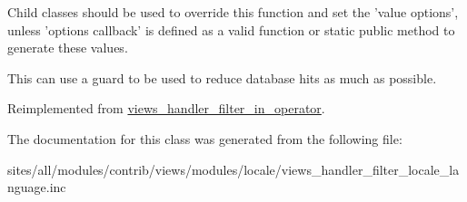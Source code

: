 Child classes should be used to override this function and set the 'value options', unless 'options callback' is defined as a valid function or static public method to generate these values.

This can use a guard to be used to reduce database hits as much as possible. 

Reimplemented from \hyperlink{classviews__handler__filter__in__operator_a5b5df6d90f4359ed28c0c446bdc81a6}{views\_\-handler\_\-filter\_\-in\_\-operator}.

The documentation for this class was generated from the following file:\begin{CompactItemize}
\item 
sites/all/modules/contrib/views/modules/locale/views\_\-handler\_\-filter\_\-locale\_\-language.inc\end{CompactItemize}
